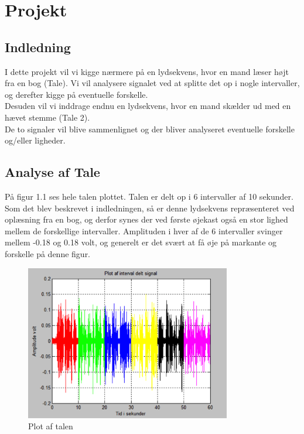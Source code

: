 \chapter{Projekt}

\section{Indledning} 
I dette projekt vil vi kigge nærmere på en lydsekvens, hvor en mand læser højt fra en bog (Tale). Vi vil analysere signalet ved at splitte det op i nogle intervaller, og derefter kigge på eventuelle forskelle. \\Desuden vil vi inddrage endnu en lydsekvens, hvor en mand skælder ud med en hævet stemme (Tale 2). \\De to signaler vil blive sammenlignet og der bliver analyseret eventuelle forskelle og/eller ligheder. 

\section{Analyse af Tale}
På figur 1.1 ses hele talen plottet. Talen er delt op i 6 intervaller af 10 sekunder. Som det blev beskrevet i indledningen, så er denne lydsekvens repræsenteret ved oplæsning fra en bog, og derfor synes der ved første øjekast også en stor lighed mellem de forskellige intervaller. Amplituden i hver af de 6 intervaller svinger mellem -0.18 og 0.18 volt, og generelt er det svært at få øje på markante og forskelle på denne figur.

\begin{figure}[H]
	\centering
	\includegraphics[width=0.8\textwidth]{Figur/Snip20151201_5}
	\caption{Plot af talen}
\end{figure}

